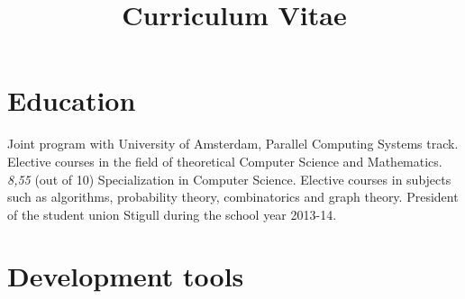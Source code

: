 \documentclass[11pt,a4paper,sans]{moderncv}
\title{Curriculum Vitae}
\begin{document}
\makecvtitle

\section{Education}
 {Joint program with University of Amsterdam, Parallel
Computing Systems track. Elective courses in the field of theoretical Computer 
Science and Mathematics.}
{\textit{8,55} (out of 10)} {Specialization in Computer Science. Elective courses
in subjects such as algorithms, probability theory, combinatorics and graph theory. 
President of the student union Stigull during the school year 2013-14.}

\section{Development tools}
\end{document}
